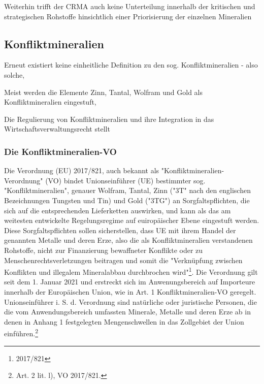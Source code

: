 \documentclass[12pt,a4paper,oneside]{book} %
\begin{document}
Weiterhin trifft der CRMA auch keine Unterteilung innerhalb der kritischen und strategischen Rohstoffe hinsichtlich einer Priorisierung der einzelnen Mineralien

\subsection{Konfliktmineralien}
Erneut existiert keine einheitliche Definition zu den sog. Konfliktmineralien - also solche, 

Meist werden die Elemente Zinn, Tantal, Wolfram und Gold als Konfliktmineralien eingestuft, 

Die Regulierung von Konfliktmineralien und ihre Integration in das Wirtschaftsverwaltungsrecht stellt 

\subsubsection{Die Konfliktmineralien-VO}
Die Verordnung (EU) 2017/821, auch bekannt als "Konfliktmineralien-Verordnung" (VO) bindet Unionseinführer (UE) bestimmter sog. "Konfliktmineralien", genauer Wolfram, Tantal, Zinn ("3T" nach den englischen Bezeichnungen Tungsten und Tin) und Gold ("3TG") an Sorgfaltspflichten, die sich auf die entsprechenden Lieferketten auswirken, und kann als das am weitesten entwickelte Regelungsregime auf euiropäischer Ebene eingestuft werden\autocite{Kalls, ZfPW 2024, 181, 199}. Diese Sorgfaltspflichten sollen sicherstellen, dass UE mit ihrem Handel der genannten Metalle und deren Erze, also die als Konfliktmineralien verstandenen Rohstoffe, nicht zur Finanzierung bewaffneter Konflikte oder zu Menschenrechtsverletzungen beitragen und somit die "Verknüpfung zwischen Konflikten und illegalem Mineralabbau durchbrochen wird"\footnote{2017/821}. Die Verordnung gilt seit dem 1. Januar 2021 und erstreckt sich im Anwenungsbereich auf Importeure innerhalb der Europäischen Union, wie in Art. 1 Konfliktmineralien-VO geregelt. Unionseinführer i. S. d. Verordnung sind natürliche oder juristische Personen, die die vom Anwendungsbereich umfassten Minerale, Metalle und deren Erze ab in denen in Anhang 1 festgelegten Mengenschwellen in das Zollgebiet der Union einführen.\footnote{Art. 2 lit. l), VO 2017/821.} 
\end{document}
